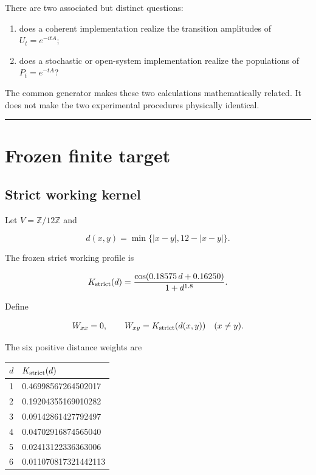 \documentclass[11pt,a4paper,openany]{report}
\begin{document}
There are two associated but distinct questions:

\begin{enumerate}
\item 
does a coherent implementation realize the transition amplitudes of \(U_t=e^{-itA}\);

\item 
does a stochastic or open-system implementation realize the populations of \(P_t=e^{-tA}\)?

\end{enumerate}

The common generator makes these two calculations mathematically related. It does not make the two experimental procedures physically identical.

\par\medskip\hrule\medskip

\chapter{Frozen finite target}

\section{Strict working kernel}

Let \(V=\mathbb Z/12\mathbb Z\) and

\[
d(x,y)=\min\{|x-y|,12-|x-y|\}.
\]

The frozen strict working profile is

\[
K_{\rm strict}(d)
=
\frac{\cos(0.18575\,d+0.16250)}{1+d^{1.8}}.
\]

Define

\[
W_{xx}=0,\qquad
W_{xy}=K_{\rm strict}(d(x,y))
\quad(x\neq y).
\]

The six positive distance weights are

\begin{center}
\begingroup\small
\setlength{\tabcolsep}{3.5pt}
\renewcommand{\arraystretch}{1.16}
\begin{longtable}{@{}p{}p{}@{}}
\toprule
\textbf{\(d\)} & \textbf{\(K_{\rm strict}(d)\)} \\
\midrule
\endhead
1 & 0.46998567264502017 \\
2 & 0.19204355169010282 \\
3 & 0.09142861427792497 \\
4 & 0.04702916874565040 \\
5 & 0.02413122336363006 \\
6 & 0.011070817321442113 \\
\bottomrule
\end{longtable}
\endgroup
\end{center}
\end{document}
